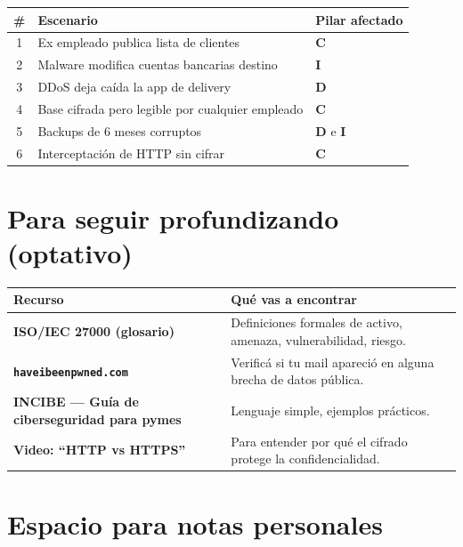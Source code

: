 \documentclass[12pt,a4paper]{article}
\renewcommand{\arraystretch}{1.25}
\begin{document}
\renewcommand{\arraystretch}{1.5}
\begin{tabularx}{\textwidth}{|c|X|>{\centering\arraybackslash}p{3.5cm}|}
\hline
\textbf{\#} & \textbf{Escenario} & \textbf{Pilar afectado} \\
\hline
1 & Ex empleado publica lista de clientes & \textbf{C} \\
\hline
2 & Malware modifica cuentas bancarias destino & \textbf{I} \\
\hline
3 & DDoS deja ca\'ida la app de delivery & \textbf{D} \\
\hline
4 & Base cifrada pero legible por cualquier empleado & \textbf{C} \\
\hline
5 & Backups de 6 meses corruptos & \textbf{D} e \textbf{I} \\
\hline
6 & Interceptaci\'on de HTTP sin cifrar & \textbf{C} \\
\hline
\end{tabularx}

\section{Para seguir profundizando (optativo)}

\renewcommand{\arraystretch}{1.4}
\begin{tabularx}{\textwidth}{>{\bfseries}p{5.5cm}X}
\toprule
Recurso & Qu\'e vas a encontrar \\
\midrule
ISO/IEC 27000 (glosario) & Definiciones formales de activo, amenaza, vulnerabilidad, riesgo. \\
\texttt{haveibeenpwned.com} & Verific\'a si tu mail apareci\'o en alguna brecha de datos p\'ublica. \\
INCIBE --- Gu\'ia de ciberseguridad para pymes & Lenguaje simple, ejemplos pr\'acticos. \\
Video: ``HTTP vs HTTPS'' & Para entender por qu\'e el cifrado protege la confidencialidad. \\
\bottomrule
\end{tabularx}

\section{Espacio para notas personales}
\end{document}
